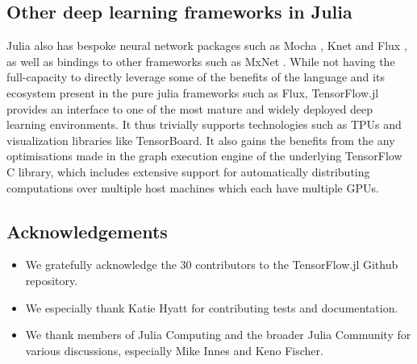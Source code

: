 \documentclass{book}
\begin{document}
\hypertarget{other-deep-learning-frameworks-in-julia}{%
\subsection{Other deep learning frameworks in
		Julia}\label{other-deep-learning-frameworks-in-julia}}

Julia also has bespoke neural network packages such as Mocha
\citep{mocha2014}, Knet \citep{knet2016} and Flux \citep{flux}, as
well as bindings to other frameworks such as MxNet \citep{mxnet2015}.
While not having the full-capacity to directly leverage some of the
benefits of the language and its ecosystem present in the pure julia
frameworks such as Flux, TensorFlow.jl provides an interface to one of
the most mature and widely deployed deep learning environments. It thus
trivially supports technologies such as TPUs and visualization libraries
like TensorBoard. It also gains the benefits from the any optimisations
made in the graph execution engine of the underlying TensorFlow C
library, which includes extensive support for automatically
distributing computations over multiple host machines which each
have multiple GPUs.

\subsection{Acknowledgements}

\begin{itemize}
	\item
	We gratefully acknowledge the 30 contributors to the TensorFlow.jl
	Github repository.
	\item
	We especially thank Katie Hyatt for contributing tests and
	documentation.
	\item
	We thank members of Julia Computing and the broader Julia Community
	for various discussions, especially Mike Innes and Keno Fischer.
\end{itemize}
\end{document}
